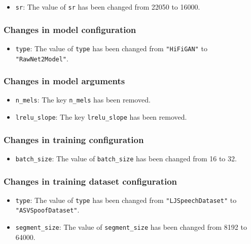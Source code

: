 \documentclass[a4paper]{article}
\begin{document}
\begin{itemize}
    \item \texttt{sr}: The value of \texttt{sr} has been changed from 22050 to 16000.
\end{itemize}

\subsubsection{Changes in model configuration}

\begin{itemize}
    \item \texttt{type}: The value of \texttt{type} has been changed from \texttt{"HiFiGAN"} to \texttt{"RawNet2Model"}.
\end{itemize}

\subsubsection{Changes in model arguments}

\begin{itemize}
    \item \texttt{n\_mels}: The key \texttt{n\_mels} has been removed.
    \item \texttt{lrelu\_slope}: The key \texttt{lrelu\_slope} has been removed.
\end{itemize}

\subsubsection{Changes in training configuration}

\begin{itemize}
    \item \texttt{batch\_size}: The value of \texttt{batch\_size} has been changed from 16 to 32.
\end{itemize}

\subsubsection{Changes in training dataset configuration}

\begin{itemize}
    \item \texttt{type}: The value of \texttt{type} has been changed from \texttt{"LJSpeechDataset"} to \texttt{"ASVSpoofDataset"}.
    \item \texttt{segment\_size}: The value of \texttt{segment\_size} has been changed from 8192 to 64000.
\end{itemize}
\end{document}
